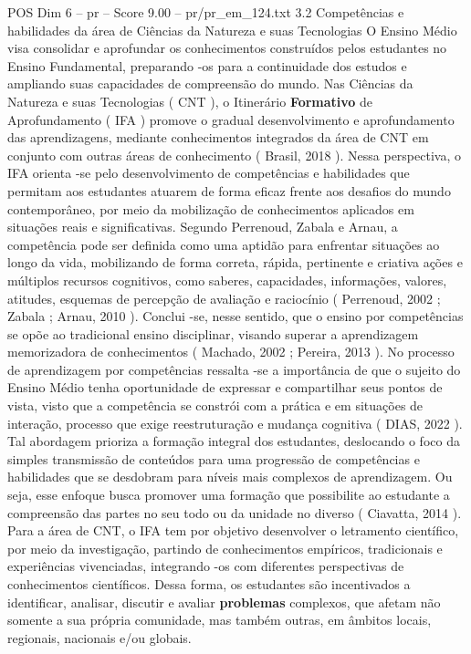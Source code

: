 \begin{textsample}{POS Dim 6 – pr – Score 9.00 – pr/pr\_em\_124.txt}  \label{ex:f6_pos_026}
3.2 Competências e habilidades da área de Ciências da Natureza e suas Tecnologias O Ensino Médio visa consolidar e aprofundar os conhecimentos construídos pelos estudantes no Ensino Fundamental, preparando -os para a continuidade dos estudos e ampliando suas capacidades de compreensão do mundo.
Nas Ciências da Natureza e suas Tecnologias ( CNT ), o Itinerário \textbf{Formativo} de Aprofundamento ( IFA ) promove o gradual desenvolvimento e aprofundamento das aprendizagens, mediante conhecimentos integrados da área de CNT em conjunto com outras áreas de conhecimento ( Brasil, 2018 ).
Nessa perspectiva, o IFA orienta -se pelo desenvolvimento de competências e habilidades que permitam aos estudantes atuarem de forma eficaz frente aos desafios do mundo contemporâneo, por meio da mobilização de conhecimentos aplicados em situações reais e significativas.
Segundo Perrenoud, Zabala e Arnau, a competência pode ser definida como uma aptidão para enfrentar situações ao longo da vida, mobilizando de forma correta, rápida, pertinente e criativa ações e múltiplos recursos cognitivos, como saberes, capacidades, informações, valores, atitudes, esquemas de percepção de avaliação e raciocínio ( Perrenoud, 2002 ; Zabala ; Arnau, 2010 ).
Conclui -se, nesse sentido, que o ensino por competências se opõe ao tradicional ensino disciplinar, visando superar a aprendizagem memorizadora de conhecimentos ( Machado, 2002 ; Pereira, 2013 ).
No processo de aprendizagem por competências ressalta -se a importância de que o sujeito do Ensino Médio tenha oportunidade de expressar e compartilhar seus pontos de vista, visto que a competência se constrói com a prática e em situações de interação, processo que exige reestruturação e mudança cognitiva ( DIAS, 2022 ).
Tal abordagem prioriza a formação integral dos estudantes, deslocando o foco da simples transmissão de conteúdos para uma progressão de competências e habilidades que se desdobram para níveis mais complexos de aprendizagem.
Ou seja, esse enfoque busca promover uma formação que possibilite ao estudante a compreensão das partes no seu todo ou da unidade no diverso ( Ciavatta, 2014 ).
Para a área de CNT, o IFA tem por objetivo desenvolver o letramento científico, por meio da investigação, partindo de conhecimentos empíricos, tradicionais e experiências vivenciadas, integrando -os com diferentes perspectivas de conhecimentos científicos.
Dessa forma, os estudantes são incentivados a identificar, analisar, discutir e avaliar \textbf{problemas} complexos, que afetam não somente a sua própria comunidade, mas também outras, em âmbitos locais, regionais, nacionais e/ou globais.

\end{textsample}
